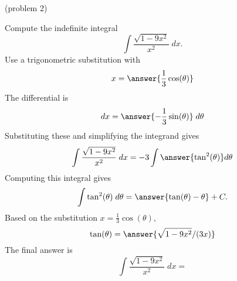 \documentclass[handout]{ximera}
\begin{document}
\begin{problem}(problem 2)

Compute the indefinite integral
\[
\int \frac{\sqrt{1-9x^2}}{x^2} \; dx.
\]
Use a trigonometric substitution with\\
\[
x = \answer{\frac13\cos(\theta)}
\]
The differential is\\
\[
dx = \answer{-\frac13\sin(\theta)} \; d\theta
\]
Substituting these and simplifying the integrand gives\\
\[
\int \frac{\sqrt{1-9x^2}}{x^2} \; dx = -3\int \answer{\tan^2(\theta)} d\theta
\]
Computing this integral gives
\[
\int \tan^2(\theta) \; d\theta = \answer{\tan(\theta) - \theta} + C.
\]
Based on the substitution $x = \frac13 \cos(\theta)$, \\
\[
\tan(\theta) = \answer{\sqrt{1-9x^2}/(3x)}
\]
The final answer is
\[
\int  \frac{\sqrt{1-9x^2}}{x^2} \; dx = 
\]
\begin{center}
\begin{multipleChoice}
\end{multipleChoice}
\end{center}





\end{problem}
\end{document}
